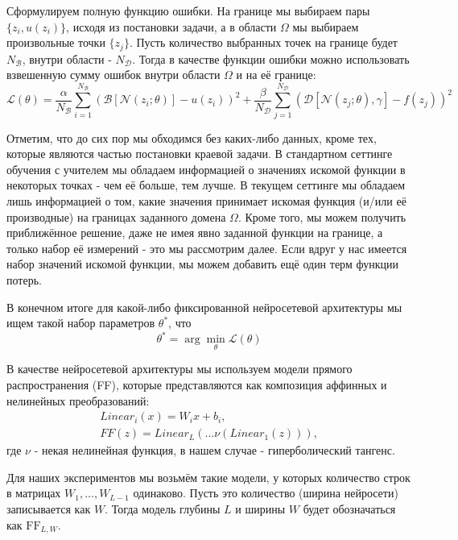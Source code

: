 \documentclass[a4paper, 12pt]{article}
\begin{document}
Сформулируем полную функцию ошибки. На границе мы выбираем пары $\{z_i, u(z_i)\}$, исходя из постановки задачи, а в области $\Omega$ мы выбираем произвольные точки $\{z_j\}$. Пусть количество выбранных точек на границе будет $N_\mathcal{B}$, внутри области - $N_\mathcal{D}$. Тогда в качестве функции ошибки можно использовать взвешенную сумму ошибок внутри области $\Omega$ и на её границе:
\begin{equation} \label{eq:pinn:empiricalLoss}
\mathcal{L}(\theta) = \frac{\alpha}{N_\mathcal{B}} \sum_{i = 1}^{N_\mathcal{B}} (\mathcal{B}[\mathcal{N}(z_i; \theta)] - u(z_i))^2 + \frac{\beta}{N_\mathcal{D}} \sum_{j = 1}^{N_\mathcal{D}} (\mathcal{D}[\mathcal{N}(z_j; \theta), \gamma] - f(z_j))^2
\end{equation}

Отметим, что до сих пор мы обходимся без каких-либо данных, кроме тех, которые являются частью постановки краевой задачи. В стандартном сеттинге обучения с учителем мы обладаем информацией о значениях искомой функции в некоторых точках - чем её больше, тем лучше. В текущем сеттинге мы обладаем лишь информацией о том, какие значения принимает искомая функция (и/или её производные) на границах заданного домена $\Omega$. Кроме того, мы можем получить приближённое решение, даже не имея явно заданной функции на границе, а только набор её измерений - это мы рассмотрим далее. Если вдруг у нас имеется набор значений искомой функции, мы можем добавить ещё один терм функции потерь.

В конечном итоге для какой-либо фиксированной нейросетевой архитектуры мы ищем такой набор параметров $\theta^*$, что
$$
\theta^* = \arg \min_{\theta} \mathcal{L}(\theta)
$$

В качестве нейросетевой архитектуры мы используем модели прямого распространения (FF), которые представляются как композиция аффинных и нелинейных преобразований:
\begin{equation} \label{eq:pinn:networkArchitecture}
    \begin{gathered}
        Linear_i(x) = W_ix + b_i,\\
        FF(z) = Linear_L(...\nu(Linear_1(z))),
    \end{gathered}
\end{equation}
где $\nu$ - некая нелинейная функция, в нашем случае - гиперболический тангенс.

Для наших экспериментов мы возьмём такие модели, у которых количество строк в матрицах $W_1, ..., W_{L-1}$ одинаково. Пусть это количество (ширина нейросети) записывается как $W$. Тогда модель глубины $L$ и ширины $W$ будет обозначаться как $\mathrm{FF}_{L, W}$.
\end{document}
